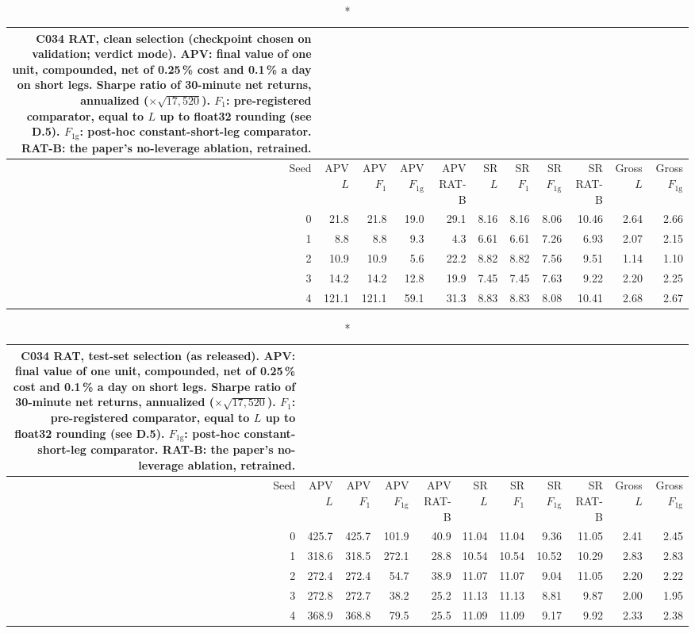 \begin{longtable}{@{}rrrrrrrrrrr@{}}
\caption*{\small C034 RAT, clean selection (checkpoint chosen on validation; verdict mode). APV: final value of one unit, compounded, net of 0.25\,\% cost and 0.1\,\% a day on short legs. Sharpe ratio of 30-minute net returns, annualized ($\times\sqrt{17{,}520}$). $F_1$: pre-registered comparator, equal to $L$ up to float32 rounding (see D.5). $F_{1\mathrm{g}}$: post-hoc constant-short-leg comparator. RAT-B: the paper's no-leverage ablation, retrained.}\\
\toprule
Seed & APV $L$ & APV $F_1$ & APV $F_{1\mathrm{g}}$ & APV RAT-B & SR $L$ & SR $F_1$ & SR $F_{1\mathrm{g}}$ & SR RAT-B & Gross $L$ & Gross $F_{1\mathrm{g}}$\\ \midrule\endhead
0 & 21.8 & 21.8 & 19.0 & 29.1 & 8.16 & 8.16 & 8.06 & 10.46 & 2.64 & 2.66\\
1 & 8.8 & 8.8 & 9.3 & 4.3 & 6.61 & 6.61 & 7.26 & 6.93 & 2.07 & 2.15\\
2 & 10.9 & 10.9 & 5.6 & 22.2 & 8.82 & 8.82 & 7.56 & 9.51 & 1.14 & 1.10\\
3 & 14.2 & 14.2 & 12.8 & 19.9 & 7.45 & 7.45 & 7.63 & 9.22 & 2.20 & 2.25\\
4 & 121.1 & 121.1 & 59.1 & 31.3 & 8.83 & 8.83 & 8.08 & 10.41 & 2.68 & 2.67\\
\bottomrule\end{longtable}
\begin{longtable}{@{}rrrrrrrrrrr@{}}
\caption*{\small C034 RAT, test-set selection (as released). APV: final value of one unit, compounded, net of 0.25\,\% cost and 0.1\,\% a day on short legs. Sharpe ratio of 30-minute net returns, annualized ($\times\sqrt{17{,}520}$). $F_1$: pre-registered comparator, equal to $L$ up to float32 rounding (see D.5). $F_{1\mathrm{g}}$: post-hoc constant-short-leg comparator. RAT-B: the paper's no-leverage ablation, retrained.}\\
\toprule
Seed & APV $L$ & APV $F_1$ & APV $F_{1\mathrm{g}}$ & APV RAT-B & SR $L$ & SR $F_1$ & SR $F_{1\mathrm{g}}$ & SR RAT-B & Gross $L$ & Gross $F_{1\mathrm{g}}$\\ \midrule\endhead
0 & 425.7 & 425.7 & 101.9 & 40.9 & 11.04 & 11.04 & 9.36 & 11.05 & 2.41 & 2.45\\
1 & 318.6 & 318.5 & 272.1 & 28.8 & 10.54 & 10.54 & 10.52 & 10.29 & 2.83 & 2.83\\
2 & 272.4 & 272.4 & 54.7 & 38.9 & 11.07 & 11.07 & 9.04 & 11.05 & 2.20 & 2.22\\
3 & 272.8 & 272.7 & 38.2 & 25.2 & 11.13 & 11.13 & 8.81 & 9.87 & 2.00 & 1.95\\
4 & 368.9 & 368.8 & 79.5 & 25.5 & 11.09 & 11.09 & 9.17 & 9.92 & 2.33 & 2.38\\
\bottomrule\end{longtable}
